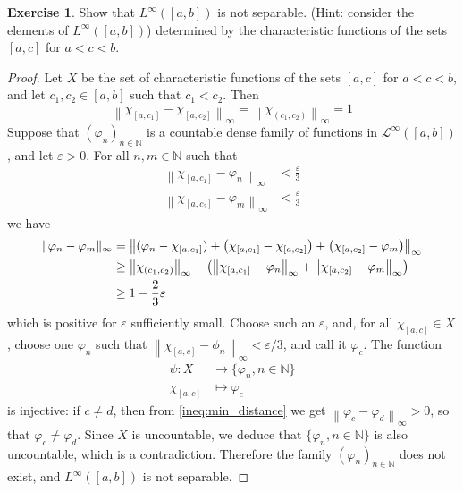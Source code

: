\documentclass[11pt,a4paper,twoside]{article}
\theoremstyle{definition}
\newcounter{excounter}
\newtheorem{exercise}[excounter]{Exercise}
\begin{document}
\begin{exercise}

  Show that $L^\infty ( [ a, b ] )$ is not separable. (Hint: consider the elements of $L^\infty ( [ a, b ] )$)
  determined by the characteristic functions of the sets $[ a, c ]$ for $a < c < b$.

\end{exercise}

\begin{proof}

  Let $X$ be the set of characteristic functions of the sets $[ a, c ]$ for $a < c < b$,
  and let $c_1, c_2 \in [ a, b ]$ such that $c_1 < c_2$. Then
  \begin{equation*}
    \left\| \chi_{[ a, c_1 ]} - \chi_{[ a, c_2 ]} \right\|_\infty = \left\| \chi_{( c_1, c_2 )} \right\|_\infty = 1
  \end{equation*}
  Suppose that $\left( \varphi_n \right)_{n \in \mathbb{N}}$ is a countable dense family of functions in $\mathscr{L}^\infty ( [ a, b ] )$,
  and let $\varepsilon > 0$. For all $n, m \in \mathbb{N}$ such that
  \begin{align*}
    \left\| \chi_{[ a, c_1 ]} - \varphi_n \right\|_\infty &< \frac{\varepsilon}{3} \\
    \left\| \chi_{[ a, c_2 ]} - \varphi_m \right\|_\infty &< \frac{\varepsilon}{3}
  \end{align*}
  we have
  \begin{align} \label{ineq:min_distance}
    \| \varphi_n - \varphi_m \|_\infty &= \left\| ( \varphi_n - \chi_{[ a, c_1 ]} )
    + \left( \chi_{[ a, c_1 ]} - \chi_{[ a, c_2 ]} \right)
    + \left( \chi_{[a, c_2]} - \varphi_m \right) \right\|_\infty \notag \\
    &\geq \left\| \chi_{( c_1, c_2 )} \right\|_\infty - \left( \left\| \chi_{[ a, c_1 ]} - \varphi_n \right\|_\infty + \left\| \chi_{[ a, c_2 ]} - \varphi_m \right\|_\infty \right) \notag \\
    &\geq 1 - \frac{2}{3} \varepsilon
  \end{align}
  which is positive for $\varepsilon$ sufficiently small. Choose such an $\varepsilon$, and, for all $\chi_{[ a, c ]} \in X$,
  choose one $\varphi_n$ such that $\left\| \chi_{[ a, c ]} - \phi_n \right\|_\infty < \varepsilon / 3$,
  and call it $\varphi_c$. The function
  \begin{align*}
    \psi : X &\to \{ \varphi_n, n \in \mathbb{N} \} \\
    \chi_{[ a, c ]} &\mapsto \varphi_c
  \end{align*}
  is injective: if $c \neq d$, then from \eqref{ineq:min_distance} we get $\left\| \varphi_c - \varphi_d \right\|_\infty > 0$,
  so that $\varphi_c \neq \varphi_d$. Since $X$ is uncountable, we deduce that $\{ \varphi_n, n \in \mathbb{N} \}$ is also uncountable,
  which is a contradiction. Therefore the family $\left( \varphi_n \right)_{n \in \mathbb{N}}$ does not exist, and $L^\infty ( [ a, b ] )$
  is not separable.

\end{proof}
\end{document}
